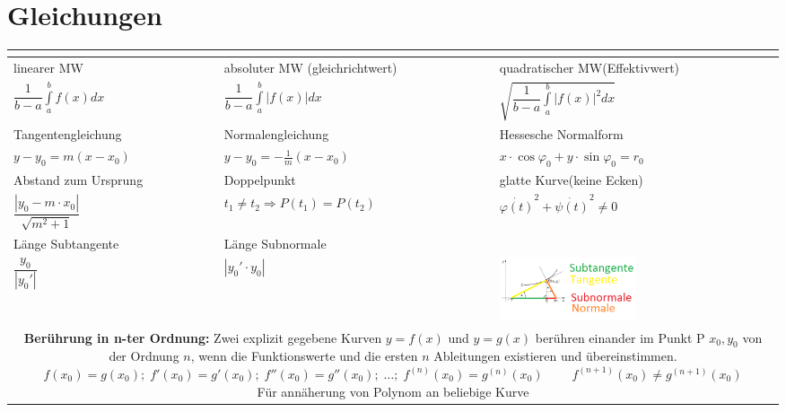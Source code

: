 \section{Gleichungen {}}
\vspace{.3cm}
	\renewcommand{\arraystretch}{1.2}
	\begin{tabularx}{540pt}{|p{160pt}|p{180pt}|X|}
		\multicolumn{3}{|c|}{}\\[-10mm]
			\hline
			linearer MW & absoluter MW (gleichrichtwert)  & quadratischer MW(Effektivwert) \\
			
			$\dfrac{1}{b-a}\int\limits_a^b f(x)dx$&
			$\dfrac{1}{b-a}\int\limits_a^b |f(x)|dx$&
			$\sqrt{\dfrac{1}{b-a} \int\limits_a^b |f(x)|^2 dx}$\\
			\hline
		
		Tangentengleichung & Normalengleichung  & Hessesche Normalform \\
		
		$y-y_0=m(x-x_0)$ &
		$y-y_0=-\frac{1}{m}(x-x_0)$ &
		$x\cdot \cos\varphi_0 +y\cdot \sin\varphi_0=r_0$ \\
		\hline
		
		Abstand zum Ursprung& Doppelpunkt& glatte Kurve(keine Ecken)\\
		
		$\dfrac{|y_0 - m \cdot x_0|}{\sqrt{m^2 + 1}}$ &
		$t_1 \neq t_2 \Rightarrow P(t_1)=P(t_2)$&
		$\dot{\varphi(t)}^2+\dot{\psi(t)}^2\neq 0$\\
		\hline
		
		Länge Subtangente & Länge Subnormale& \\
		
		$\dfrac{y_0}{|y_0'|}$&
		$|y_0' \cdot y_0|$&
		\includegraphics[width = 4cm]{bilder/3_tangent}\\
		\hline
		
		\multicolumn{3}{|c|}{
		\parbox{450pt}{\textbf{Berührung in n-ter Ordnung:} Zwei explizit gegebene Kurven $y = f(x)$ und $y = g(x)$ berühren einander im
		Punkt P $x_0, y_0$ von der Ordnung $n$, wenn die Funktionswerte und die ersten
		$n$ Ableitungen existieren und übereinstimmen.\\
		$f(x_0) = g(x_0);\; f'(x_0) = g'(x_0);\; f''(x_0) = g''(x_0);\;\ldots ;
		\;f^{(n)}(x_0) = g^{(n)}(x_0)\; \qquad f^{(n+1)}(x_0) \neq g^{(n+1)}(x_0)$\\
		Für annäherung von Polynom an beliebige Kurve}}\\
		\hline
	\end{tabularx}
	\renewcommand{\arraystretch}{1}
	
